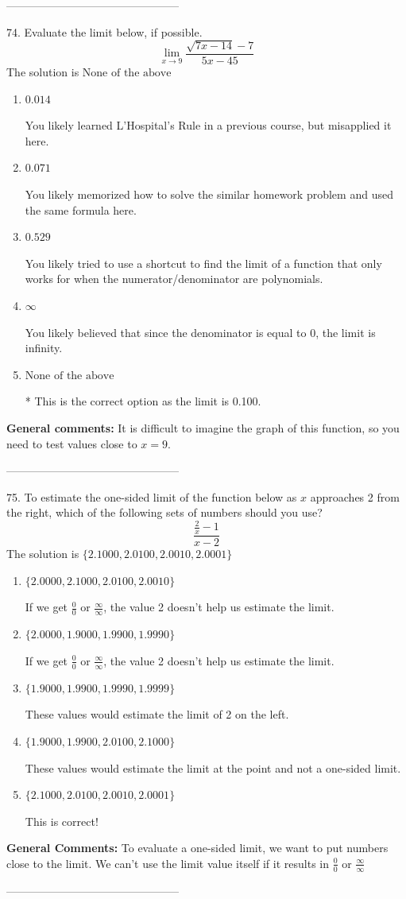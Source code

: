 \documentclass{extbook}[14pt]
\begin{document}
-----------------------------------------------

74. Evaluate the limit below, if possible.
\[ \lim_{x \rightarrow 9} \frac{\sqrt{7x - 14} - 7}{5x - 45} \] 
The solution is $ \text{None of the above} $ 

\begin{enumerate}[label=\Alph*.] 
\item $ 0.014 $ 

 You likely learned L'Hospital's Rule in a previous course, but misapplied it here. 
\item $ 0.071 $ 

 You likely memorized how to solve the similar homework problem and used the same formula here. 
\item $ 0.529 $ 

 You likely tried to use a shortcut to find the limit of a function that only works for when the numerator/denominator are polynomials. 
\item $ \infty $ 

 You likely believed that since the denominator is equal to 0, the limit is infinity. 
\item $ \text{None of the above} $ 

 * This is the correct option as the limit is 0.100. 
\end{enumerate} 
 
\textbf{General comments:} It is difficult to imagine the graph of this function, so you need to test values close to $x = 9$.

-----------------------------------------------

75. To estimate the one-sided limit of the function below as $x$ approaches 2 from the right, which of the following sets of numbers should you use?
\[ \frac{\frac{2}{x} - 1}{x - 2} \] 
The solution is $ \{ 2.1000, 2.0100, 2.0010, 2.0001 \} $ 

\begin{enumerate}[label=\Alph*.] 
\item $ \{ 2.0000, 2.1000, 2.0100, 2.0010 \} $ 

 If we get $\frac{0}{0}$ or $\frac{\infty}{\infty}$, the value 2 doesn't help us estimate the limit. 
\item $ \{ 2.0000, 1.9000, 1.9900, 1.9990 \} $ 

 If we get $\frac{0}{0}$ or $\frac{\infty}{\infty}$, the value 2 doesn't help us estimate the limit. 
\item $ \{ 1.9000, 1.9900, 1.9990, 1.9999 \} $ 

 These values would estimate the limit of 2 on the left. 
\item $ \{ 1.9000, 1.9900, 2.0100, 2.1000 \} $ 

 These values would estimate the limit at the point and not a one-sided limit. 
\item $ \{ 2.1000, 2.0100, 2.0010, 2.0001 \} $ 

 This is correct! 
\end{enumerate} 
 
\textbf{General Comments:} To evaluate a one-sided limit, we want to put numbers close to the limit. We can't use the limit value itself if it results in $\frac{0}{0}$ or $\frac{\infty}{\infty}$

-----------------------------------------------
\end{document}
